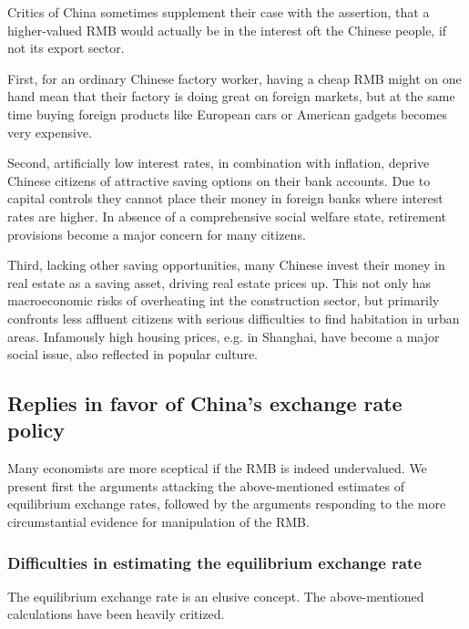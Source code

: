 Critics of China sometimes supplement their case with the assertion, that a higher-valued RMB would actually be in the interest oft the Chinese people, if not its export sector.

First, for an ordinary Chinese factory worker, having a cheap RMB might on one hand mean that their factory 
is doing great on foreign markets, but at the same time buying foreign 
products like European cars or American gadgets becomes very expensive. 

Second, artificially low interest rates, in combination with inflation, deprive Chinese citizens of attractive saving options on their bank accounts. Due to capital controls they cannot place their money in foreign banks where interest rates are higher. In absence of a comprehensive social welfare state, retirement provisions become a major concern for many citizens.

Third, lacking other saving opportunities, many Chinese invest their money in real estate as a saving asset, driving real estate prices up. This not only has macroeconomic risks of overheating int the construction sector, but primarily confronts less affluent citizens with serious difficulties to find habitation in urban areas. Infamously high housing prices, e.g. in Shanghai, have become a major social issue, also reflected in popular culture. %



\subsection{Replies in favor of China's exchange rate policy}

Many economists are more sceptical if the RMB is indeed undervalued. We present first the arguments attacking the above-mentioned estimates of equilibrium exchange rates, followed by the arguments responding to the more circumstantial evidence for manipulation of the RMB.

\subsubsection{Difficulties in estimating the equilibrium exchange rate}

The equilibrium exchange rate is an elusive concept. The above-mentioned calculations have been heavily critized.

